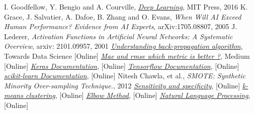 \begin{thebibliography}{9}
 I. Goodfellow, Y. Bengio and A. Courville, \href{http://www.deeplearningbook.org}{\emph{Deep Learning}}, MIT Press, 2016
K. Grace, J. Salvatier, A. Dafoe, B. Zhang and O. Evans, \emph{When Will AI Exceed Human Performance? Evidence from AI Experts}, arXiv:1705.08807, 2005
 J. Lederer, \emph{Activation Functions in Artificial Neural Networks: A Systematic Overview}, arxiv: 2101.09957, 2001
\href{https://towardsdatascience.com/understanding-backpropagation-algorithm-7bb3aa2f95fd}{\emph{Understanding back-propagation algorithm}}, Towards Data Science [Online]
\href{https://medium.com/human-in-a-machine-world/mae-and-rmse-which-metric-is-better-e60ac3bde13d}{\emph{Mae and rmse which metric is better ?}}, Medium [Online]
\href{https://keras.io/}{\emph{Keras Documentation}}, [Online]  
\href{https://www.tensorflow.org/}{\emph{Tensorflow Documentation}}, [Online] 
\href{https://scikit-learn.org/stable/}{\emph{scikit-learn Documentation}}, [Online]
Nitesh Chawla, et al., \emph{SMOTE: Synthetic Minority Over-sampling Technique.}, 2012
\href{https://en.wikipedia.org/wiki/Sensitivity_and_specificity}{\emph{Sensitivity and specificity}}, [Online]
\href{https://en.wikipedia.org/wiki/K-means_clustering}{\emph{k-means clustering}}, [Online]
\href{https://en.wikipedia.org/wiki/Elbow_method_(clustering)}{\emph{Elbow Method}}, [Online]
\href{https://www.ibm.com/cloud/learn/natural-language-processing}{\emph{Natural Language Processing}}, [Online]
\end{thebibliography}